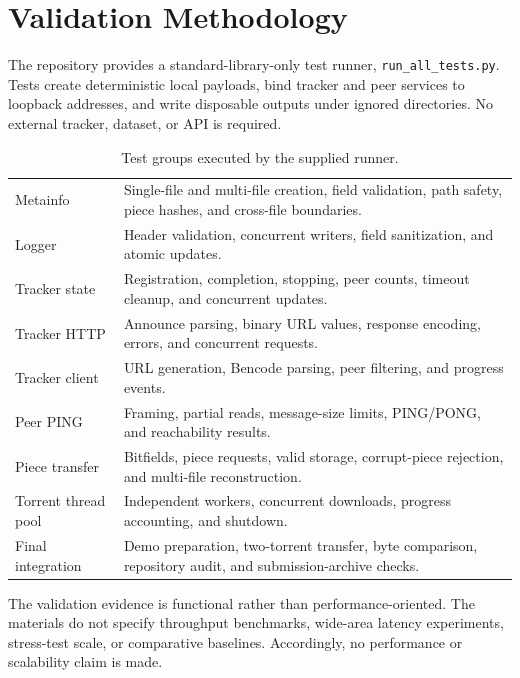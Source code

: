 \section{Validation Methodology}
\label{sec:validation}

The repository provides a standard-library-only test runner, \texttt{run\_all\_tests.py}. Tests create deterministic local payloads, bind tracker and peer services to loopback addresses, and write disposable outputs under ignored directories. No external tracker, dataset, or API is required.

\begin{table}[tbp]
  \centering
  \caption{Test groups executed by the supplied runner.}
  \label{tab:test-groups}
  \begin{tabularx}{\textwidth}{@{}p{}Y@{}}
    \toprule
     &  \\
    \midrule
    Metainfo & Single-file and multi-file creation, field validation, path safety, piece hashes, and cross-file boundaries. \\
    Logger & Header validation, concurrent writers, field sanitization, and atomic updates. \\
    Tracker state & Registration, completion, stopping, peer counts, timeout cleanup, and concurrent updates. \\
    Tracker HTTP & Announce parsing, binary URL values, response encoding, errors, and concurrent requests. \\
    Tracker client & URL generation, Bencode parsing, peer filtering, and progress events. \\
    Peer PING & Framing, partial reads, message-size limits, PING/PONG, and reachability results. \\
    Piece transfer & Bitfields, piece requests, valid storage, corrupt-piece rejection, and multi-file reconstruction. \\
    Torrent thread pool & Independent workers, concurrent downloads, progress accounting, and shutdown. \\
    Final integration & Demo preparation, two-torrent transfer, byte comparison, repository audit, and submission-archive checks. \\
    \bottomrule
  \end{tabularx}
\end{table}

The validation evidence is functional rather than performance-oriented. The materials do not specify throughput benchmarks, wide-area latency experiments, stress-test scale, or comparative baselines. Accordingly, no performance or scalability claim is made.
